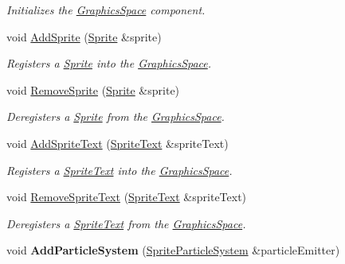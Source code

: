 \begin{DoxyCompactItemize}
\begin{DoxyCompactList}\small\item\em Initializes the \hyperlink{classDCEngine_1_1Components_1_1GraphicsSpace}{Graphics\-Space} component. \end{DoxyCompactList}\item 
void \hyperlink{classDCEngine_1_1Components_1_1GraphicsSpace_a2e85cafcdd8d4f319304efd7e2428ba6}{Add\-Sprite} (\hyperlink{classDCEngine_1_1Components_1_1Sprite}{Sprite} \&sprite)
\begin{DoxyCompactList}\small\item\em Registers a \hyperlink{classDCEngine_1_1Components_1_1Sprite}{Sprite} into the \hyperlink{classDCEngine_1_1Components_1_1GraphicsSpace}{Graphics\-Space}. \end{DoxyCompactList}\item 
void \hyperlink{classDCEngine_1_1Components_1_1GraphicsSpace_afdfd96b23b80491dcb79770fbb34662c}{Remove\-Sprite} (\hyperlink{classDCEngine_1_1Components_1_1Sprite}{Sprite} \&sprite)
\begin{DoxyCompactList}\small\item\em Deregisters a \hyperlink{classDCEngine_1_1Components_1_1Sprite}{Sprite} from the \hyperlink{classDCEngine_1_1Components_1_1GraphicsSpace}{Graphics\-Space}. \end{DoxyCompactList}\item 
\hypertarget{classDCEngine_1_1Components_1_1GraphicsSpace_ad5613e661932c45ab28d970b2f392963}{void \hyperlink{classDCEngine_1_1Components_1_1GraphicsSpace_ad5613e661932c45ab28d970b2f392963}{Add\-Sprite\-Text} (\hyperlink{classDCEngine_1_1Components_1_1SpriteText}{Sprite\-Text} \&sprite\-Text)}\label{classDCEngine_1_1Components_1_1GraphicsSpace_ad5613e661932c45ab28d970b2f392963}

\begin{DoxyCompactList}\small\item\em Registers a \hyperlink{classDCEngine_1_1Components_1_1SpriteText}{Sprite\-Text} into the \hyperlink{classDCEngine_1_1Components_1_1GraphicsSpace}{Graphics\-Space}. \end{DoxyCompactList}\item 
void \hyperlink{classDCEngine_1_1Components_1_1GraphicsSpace_a94c0a07a95c67e92e4b5719ae8b58750}{Remove\-Sprite\-Text} (\hyperlink{classDCEngine_1_1Components_1_1SpriteText}{Sprite\-Text} \&sprite\-Text)
\begin{DoxyCompactList}\small\item\em Deregisters a \hyperlink{classDCEngine_1_1Components_1_1SpriteText}{Sprite\-Text} from the \hyperlink{classDCEngine_1_1Components_1_1GraphicsSpace}{Graphics\-Space}. \end{DoxyCompactList}\item 
\hypertarget{classDCEngine_1_1Components_1_1GraphicsSpace_a138f55b900df75cd0353d6ee60bf1589}{void {\bfseries Add\-Particle\-System} (\hyperlink{classDCEngine_1_1Components_1_1SpriteParticleSystem}{Sprite\-Particle\-System} \&particle\-Emitter)}\label{classDCEngine_1_1Components_1_1GraphicsSpace_a138f55b900df75cd0353d6ee60bf1589}


\end{DoxyCompactItemize}
